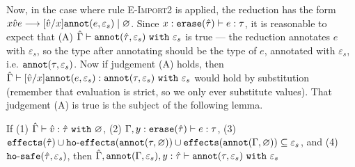Now, in the case where rule \textsc{E-Import2} is applied, the reduction has the form
${x}{\hat v}{e} \longrightarrow
[\hat v/x]\mathtt{annot}(e, \varepsilon_s) \mid \varnothing$. Since
$x: \mathtt{erase}(\hat \tau) \vdash e: \tau$, it is reasonable to expect that (A) $\hat
\Gamma \vdash \mathtt{annot}(\hat \tau, \varepsilon_s)~\mathtt{with}~ \varepsilon_s$ is true
--- the reduction annotates $e$ with $\varepsilon_s$, so the type after annotating
should be the type of $e$, annotated with $\varepsilon_s$, i.e.
$\mathtt{annot}(\tau, \varepsilon_s)$. Now if judgement (A) holds, then $\hat \Gamma
\vdash [\hat v/x]\mathtt{annot}(e, \varepsilon_s): \mathtt{annot}(\tau, \varepsilon_s)~\mathtt{with}~
\varepsilon_s$ would hold by substitution (remember that evaluation is strict, so
we only ever substitute values). That judgement (A) is true is the subject of the
following lemma.

\begin{lemma}
If 
(1) $\hat \Gamma \vdash \hat v: \hat \tau ~ \mathtt{with}~ \varnothing$,
(2) $\Gamma, y: \mathtt{erase}(\hat \tau) \vdash e: \tau$,
(3) $\mathtt{effects}(\hat \tau) \cup \mathtt{ho \hbox{-} effects}(\mathtt{annot}(\tau, \varnothing)) \cup
    \mathtt{effects}(\mathtt{annot}(\Gamma, \varnothing)) \subseteq \varepsilon_s$, and
(4) $\mathtt{ho \hbox{-} safe}(\hat \tau, \varepsilon_s)$,
then $\hat \Gamma, \mathtt{annot}(\Gamma, \varepsilon_s), y: \hat \tau \vdash
	\mathtt{annot}(\tau, \varepsilon_s) ~\mathtt{with}~ \varepsilon_s$

\end{lemma}

